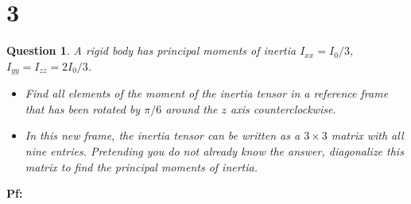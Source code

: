 \documentclass{article}
\newtheorem{question}{Question}
\begin{document}
\break

\section*{3}
\begin{question}\label{q3}
    A rigid body has principal moments of inertia $I_{xx}=I_0/3$, $I_{yy}=I_{zz}=2I_0/3$.
    \begin{itemize}
        \item[(a)] Find all elements of the moment of the inertia tensor in a reference frame that has been rotated by $\pi/6$ around the $z$ axis counterclockwise.
        \item[(b)] In this new frame, the inertia tensor can be written as a $3\times 3$ matrix with all nine entries. Pretending you do not already know the answer, diagonalize this matrix to find the principal moments of inertia. 
    \end{itemize}
\end{question}

\textbf{Pf:}
\end{document}
